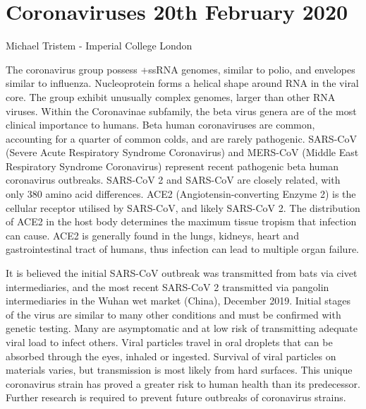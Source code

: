 \documentclass{article}
\begin{document}
\section{Coronaviruses 20th February 2020}

Michael Tristem - Imperial College London \bigskip

\noindent The coronavirus group possess +ssRNA genomes, similar to polio, and envelopes similar to influenza. Nucleoprotein forms a helical shape around RNA in the viral core. The group exhibit unusually complex genomes, larger than other RNA viruses. Within the Coronavinae subfamily, the beta virus genera are of the most clinical importance to humans. Beta human coronaviruses are common, accounting for a quarter of common colds, and are rarely pathogenic. SARS-CoV (Severe Acute Respiratory Syndrome Coronavirus) and MERS-CoV (Middle East Respiratory Syndrome Coronavirus) represent recent pathogenic beta human coronavirus outbreaks. SARS-CoV 2 and SARS-CoV are closely related, with only 380 amino acid differences. ACE2 (Angiotensin-converting Enzyme 2) is the cellular receptor utilised by SARS-CoV, and likely SARS-CoV 2. The distribution of ACE2 in the host body determines the maximum tissue tropism that infection can cause. ACE2 is generally found in the lungs, kidneys, heart and gastrointestinal tract of humans, thus infection can lead to multiple organ failure. \bigskip

\noindent It is believed the initial SARS-CoV outbreak was transmitted from bats via civet intermediaries, and the most recent SARS-CoV 2 transmitted via pangolin intermediaries in the Wuhan wet market (China), December 2019. Initial stages of the virus are similar to many other conditions and must be confirmed with genetic testing. Many are asymptomatic and at low risk of transmitting adequate viral load to infect others. Viral particles travel in oral droplets that can be absorbed through the eyes, inhaled or ingested. Survival of viral particles on materials varies, but transmission is most likely from hard surfaces. This unique coronavirus strain has proved a greater risk to human health than its predecessor. Further research is required to prevent future outbreaks of coronavirus strains.   
\end{document}
